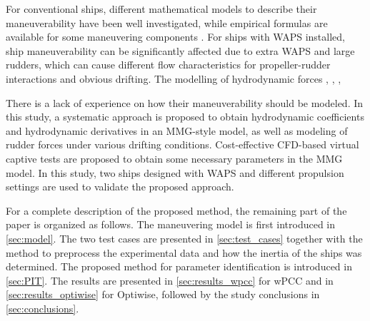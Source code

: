 For conventional ships, different mathematical models to describe their maneuverability have been well investigated, while empirical formulas are available for some maneuvering components \citep{yasukawaIntroductionMMGStandard2015}. For ships with WAPS installed, ship maneuverability can be significantly affected due to extra WAPS and large rudders, which can cause different flow characteristics for propeller-rudder interactions and obvious drifting. 
The modelling of hydrodynamic forces 
 \citep{violaNumericalMethodDesign2015}, \citep{tillig4DOFSimulation2019}, \citep{kjellbergSailingPerformanceWindPowered2023},

There is a lack of experience on how their maneuverability should be modeled. In this study, a systematic approach is proposed to obtain hydrodynamic coefficients and hydrodynamic derivatives in an MMG-style model, as well as modeling of rudder forces under various drifting conditions. Cost-effective CFD-based virtual captive tests are proposed to obtain some necessary parameters in the MMG model. In this study, two ships designed with WAPS and different propulsion settings are used to validate the proposed approach.

For a complete description of the proposed method, the remaining part of the paper is organized as follows. The maneuvering model is first introduced in \autoref{sec:model}. The two test cases are presented in \autoref{sec:test_cases} together with the method to preprocess the experimental data and how the inertia of the ships was determined. The proposed method for parameter identification is introduced in \autoref{sec:PIT}. The results are presented in \autoref{sec:results_wpcc} for wPCC and in \autoref{sec:results_optiwise} for Optiwise, followed by the study conclusions in \autoref{sec:conclusions}.



